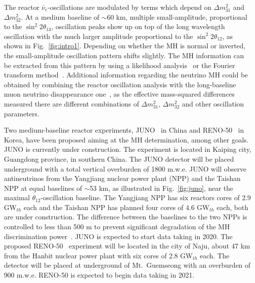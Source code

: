 \documentclass[aps,twocolumn,preprintnumbers,amsmath,superscriptaddress,amssymb,floats,nofootinbib]{revtex4-1}
\begin{document}
The reactor $\bar\nu_e$-oscillations are modulated by terms which depend on $\Delta m^2_{31}$ and $\Delta m^2_{32}$.
At a medium baseline of $\sim$60 km, multiple small-amplitude, proportional to the $\sin^2 2 \theta_{13}$, oscillation peaks show up
on top of the long wavelength oscillation with the much larger amplitude proportional to the $\sin^2 2 \theta_{12}$, as shown in Fig.~\ref{fig:intro1}.
Depending on whether the MH is normal or inverted, the small-amplitude oscillation pattern shifts slightly.
The MH information can be extracted from this pattern by using a likelihood analysis~\cite{Li-PRD13} or the Fourier transform method~\cite{Zhan-PRD08,Zhan-PRD09}.
Additional information regarding the neutrino MH could be obtained by combining the reactor oscillation analysis with the long-baseline muon neutrino disappearance one~\cite{Minakata},
as the effective mass-squared differences measured there are different combinations of $\Delta m^2_{31}$, $\Delta m^2_{32}$ and other oscillation parameters.

Two medium-baseline reactor experiments, JUNO~\cite{He-Now2014} in China and RENO-50~\cite{RENO-50} in Korea, have been proposed aiming at the MH determination, among other goals. JUNO is currently under construction.
The experiment is located in Kaiping city, Guangdong province, in southern China.
The JUNO detector will be placed underground with a total vertical overburden of 1800 m.w.e. JUNO will observe antineutrinos from the Yangjiang nuclear power plant (NPP) and the Taishan NPP at equal baselines of $\sim$53 km, as illustrated in Fig.~\ref{fig:juno}, near the maximal $\theta_{12}$-oscillation baseline. The Yangjiang NPP has six reactors cores of 2.9 GW$_{th}$ each and the Taishan NPP has planned four cores of 4.6 GW$_{th}$ each, both are under construction. The difference between the baselines to the two NPPs is controlled to less than 500 m to prevent significant degradation of the MH discrimination power~\cite{Li-PRD13}. JUNO is expected to start data taking in 2020. The proposed RENO-50~\cite{RENO-50} experiment will be located in the city of Naju, about 47 km from the Hanbit nuclear power plant with six cores of 2.8 GW$_{th}$ each. The detector will be placed at underground of Mt.~Guemseong with an overburden of 900 m.w.e. RENO-50 is expected to begin data taking in 2021.
\end{document}
